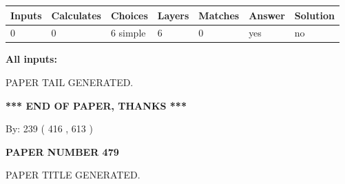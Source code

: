 \documentclass[12pt]{article}
\begin{document}
   
   
   
\noindent\begin{tabular}{|l|l|l|l|l|l|l|}
 \hline
Inputs & Calculates & Choices & Layers & Matches & Answer & Solution \\ \hline
 0  & 
 0  & 
 6
  simple  
  & 
 6  & 
 0  & 
  yes & 
  no 
  \\ \hline
 \end{tabular}
   
   
   
   
\noindent{}
   
   
   
   
\noindent\vspace{0.1in}\hspace{-0.08in} {\textbf{\Large{All inputs: }}}
   
   
   
   
   
   
 \vspace{0.2in}
 
   
   
\vspace{2.0in} PAPER TAIL GENERATED.
   
   
   
   
\vspace{1.0in} 
{\textbf{\large{ *** END OF PAPER, THANKS *** }}} 
   
   
\hspace{1.0in} By: 
 239 ( 416 ,  613 )
   
   
   
   
\newpage 
\setcounter{page}{ 
   479001 } 
   
   
   
   
 {\textbf{ \Large{ PAPER NUMBER  479  }}}
   
   
\vspace{0.2in}
   
   
   
   
   
   
   
   
 \vspace{0.2in}
 
 
 
 
   
   
 PAPER TITLE GENERATED.
   
   
   
\end{document}
